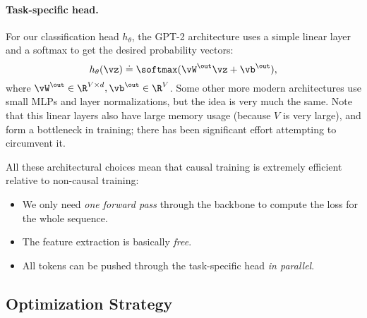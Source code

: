 \documentclass[../../book-main.tex]{subfiles}
\begin{document}
\paragraph{Task-specific head.} For our classification head \(h_{\theta}\), the GPT-2 architecture uses a simple linear layer and a softmax to get the desired probability vectors:
\begin{equation}
    h_{\theta}(\vz) \doteq \softmax(\vW^{\out}\vz + \vb^{\out}),
\end{equation}
where \(\vW^{\out} \in \R^{V \times d}, \vb^{\out} \in \R^{V}\). Some other more modern architectures use small MLPs and layer normalizations, but the idea is very much the same. Note that this linear layers also have large memory usage (because \(V\) is very large), and form a bottleneck in training; there has been significant effort attempting to circumvent it.

All these architectural choices mean that causal training is extremely efficient relative to non-causal training:
\begin{itemize}
    \item We only need \textit{one forward pass} through the backbone to compute the loss for the whole sequence.
    \item The feature extraction is basically \textit{free}.
    \item All tokens can be pushed through the task-specific head \textit{in parallel}.
\end{itemize}

\subsection{Optimization Strategy}
\end{document}
